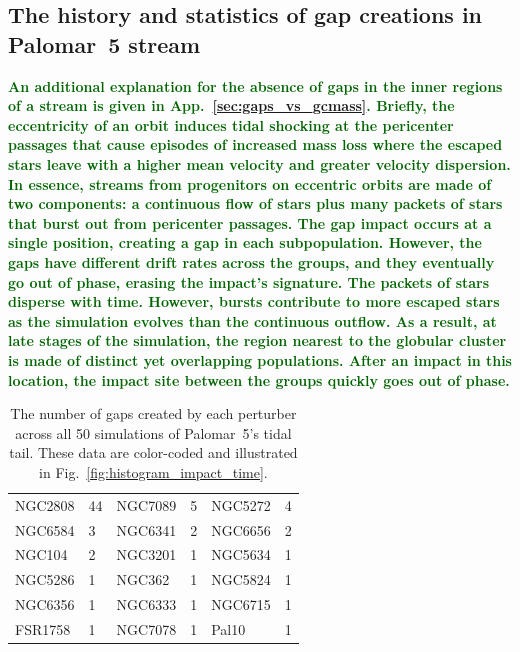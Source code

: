 \documentclass{aa}
\newcommand{\salvatore}[1]{\textcolor{darkgreen}{{#1}}}
\begin{document}
  \subsection{The history and statistics of gap creations in Palomar~5 stream}\label{sect:history}
  

      


    \textbf{\salvatore{An additional explanation for the absence of gaps in the inner regions of a stream is given in App.~\ref{sec:gaps_vs_gcmass}. Briefly, the eccentricity of an orbit induces tidal shocking at the pericenter passages that cause episodes of increased mass loss where the escaped stars leave with a higher mean velocity and greater velocity dispersion. In essence, streams from progenitors on eccentric orbits are made of two components: a continuous flow of stars plus many packets of stars that burst out from pericenter passages. The gap impact occurs at a single position, creating a gap in each subpopulation. However, the gaps have different drift rates across the groups, and they eventually go out of phase, erasing the impact's signature. The packets of stars disperse with time. However, bursts contribute to more escaped stars as the simulation evolves than the continuous outflow. As a result, at late stages of the simulation, the region nearest to the globular cluster is made of distinct yet overlapping populations. After an impact in this location, the impact site between the groups quickly goes out of phase. }}

    

    \begin{table}[h]
      \centering
      \begin{tabular}{|ll|ll|ll|}
      \hline
      NGC2808 & 44 & NGC7089 & 5 & NGC5272 & 4 \\
      NGC6584 & 3 & NGC6341 & 2 & NGC6656 & 2 \\
      NGC104 & 2 & NGC3201 & 1 & NGC5634 & 1 \\
      NGC5286 & 1 & NGC362 & 1 & NGC5824 & 1 \\
      NGC6356 & 1 & NGC6333 & 1 & NGC6715 & 1 \\
      FSR1758 & 1 & NGC7078 & 1 & Pal10 & 1 \\
      \hline
      \end{tabular}
      \caption{The number of gaps created by each perturber across all 50 simulations of Palomar~5's tidal tail. These data are color-coded and illustrated in Fig.~\ref{fig:histogram_impact_time}.}
      \label{tab:gaps_per_perturber}
    \end{table} 
    
\end{document}
